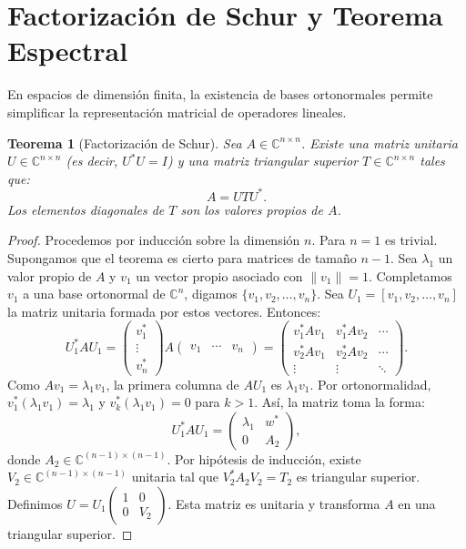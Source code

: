 \documentclass[a4paper,11pt]{report}
\newtheorem{theorem}{Teorema}[chapter]
\begin{document}
\section{Factorización de Schur y Teorema Espectral}

En espacios de dimensión finita, la existencia de bases ortonormales permite simplificar la representación matricial de operadores lineales.

\begin{theorem}[Factorización de Schur]
\label{thm:schur}
Sea $A \in \mathbb{C}^{n \times n}$. Existe una matriz unitaria $U \in \mathbb{C}^{n \times n}$ (es decir, $U^* U = I$) y una matriz triangular superior $T \in \mathbb{C}^{n \times n}$ tales que:
\[
A = U T U^*.
\]
Los elementos diagonales de $T$ son los valores propios de $A$.
\end{theorem}

\begin{proof}
Procedemos por inducción sobre la dimensión $n$. Para $n=1$ es trivial.
Supongamos que el teorema es cierto para matrices de tamaño $n-1$. Sea $\lambda_1$ un valor propio de $A$ y $v_1$ un vector propio asociado con $\|v_1\|=1$.
Completamos $v_1$ a una base ortonormal de $\mathbb{C}^n$, digamos $\{v_1, v_2, \ldots, v_n\}$. Sea $U_1 = [v_1, v_2, \ldots, v_n]$ la matriz unitaria formada por estos vectores.
Entonces:
\[
U_1^* A U_1 = \begin{pmatrix} v_1^* \\ \vdots \\ v_n^* \end{pmatrix} A \begin{pmatrix} v_1 & \cdots & v_n \end{pmatrix} = \begin{pmatrix} v_1^* A v_1 & v_1^* A v_2 & \cdots \\ v_2^* A v_1 & v_2^* A v_2 & \cdots \\ \vdots & \vdots & \ddots \end{pmatrix}.
\]
Como $A v_1 = \lambda_1 v_1$, la primera columna de $A U_1$ es $\lambda_1 v_1$. Por ortonormalidad, $v_1^* (\lambda_1 v_1) = \lambda_1$ y $v_k^* (\lambda_1 v_1) = 0$ para $k > 1$.
Así, la matriz toma la forma:
\[
U_1^* A U_1 = \begin{pmatrix} \lambda_1 & w^* \\ 0 & A_2 \end{pmatrix},
\]
donde $A_2 \in \mathbb{C}^{(n-1) \times (n-1)}$.
Por hipótesis de inducción, existe $V_2 \in \mathbb{C}^{(n-1) \times (n-1)}$ unitaria tal que $V_2^* A_2 V_2 = T_2$ es triangular superior.
Definimos $U = U_1 \begin{pmatrix} 1 & 0 \\ 0 & V_2 \end{pmatrix}$. Esta matriz es unitaria y transforma $A$ en una triangular superior.
\end{proof}
\end{document}
